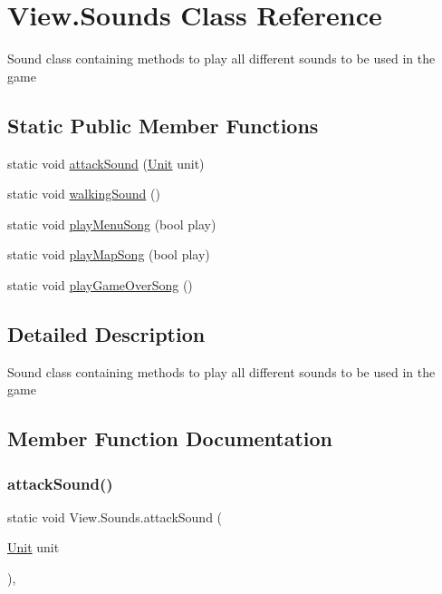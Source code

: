 \hypertarget{class_view_1_1_sounds}{}\section{View.\+Sounds Class Reference}
\label{class_view_1_1_sounds}


Sound class containing methods to play all different sounds to be used in the game  


\subsection*{Static Public Member Functions}
\begin{DoxyCompactItemize}
\item 
static void \hyperlink{class_view_1_1_sounds_a4d37e8e53cdd408544b924d1d8343ad7}{attack\+Sound} (\hyperlink{interface_model_1_1_unit_module_1_1_unit}{Unit} unit)
\item 
static void \hyperlink{class_view_1_1_sounds_aa798fd781b805d8497ff19819fe97088}{walking\+Sound} ()
\item 
static void \hyperlink{class_view_1_1_sounds_a375e38c529895c398a8b96bd358bcabc}{play\+Menu\+Song} (bool play)
\item 
static void \hyperlink{class_view_1_1_sounds_a00111a18d755859f6c1e7e619cedd636}{play\+Map\+Song} (bool play)
\item 
static void \hyperlink{class_view_1_1_sounds_ada712efeff25692ef207a76d1833dad1}{play\+Game\+Over\+Song} ()
\end{DoxyCompactItemize}


\subsection{Detailed Description}
Sound class containing methods to play all different sounds to be used in the game 



\subsection{Member Function Documentation}
\hypertarget{class_view_1_1_sounds_a4d37e8e53cdd408544b924d1d8343ad7}{}\label{class_view_1_1_sounds_a4d37e8e53cdd408544b924d1d8343ad7} 
\subsubsection{\texorpdfstring{attack\+Sound()}{attackSound()}}
{\footnotesize\ttfamily static void View.\+Sounds.\+attack\+Sound (\begin{DoxyParamCaption}\item[{\hyperlink{interface_model_1_1_unit_module_1_1_unit}{Unit}}]{unit }\end{DoxyParamCaption})\hspace{0.3cm}{\ttfamily [inline]}, {\ttfamily [static]}}

